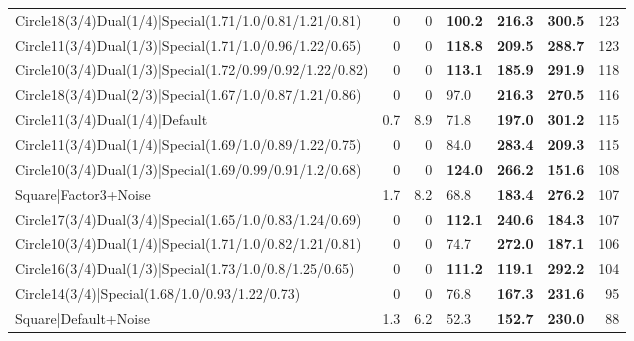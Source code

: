 \begin{tabular}{lrrlllr}
 Circle18(3/4)Dual(1/4)|Special(1.71/1.0/0.81/1.21/0.81)      &          0   &            0   & \textbf{100.2} & \textbf{216.3} & \textbf{300.5} &          123 \\
 Circle11(3/4)Dual(1/3)|Special(1.71/1.0/0.96/1.22/0.65)      &          0   &            0   & \textbf{118.8} & \textbf{209.5} & \textbf{288.7} &          123 \\
 Circle10(3/4)Dual(1/3)|Special(1.72/0.99/0.92/1.22/0.82)     &          0   &            0   & \textbf{113.1} & \textbf{185.9} & \textbf{291.9} &          118 \\
 Circle18(3/4)Dual(2/3)|Special(1.67/1.0/0.87/1.21/0.86)      &          0   &            0   & 97.0           & \textbf{216.3} & \textbf{270.5} &          116 \\
 Circle11(3/4)Dual(1/4)|Default                               &          0.7 &            8.9 & 71.8           & \textbf{197.0} & \textbf{301.2} &          115 \\
 Circle11(3/4)Dual(1/4)|Special(1.69/1.0/0.89/1.22/0.75)      &          0   &            0   & 84.0           & \textbf{283.4} & \textbf{209.3} &          115 \\
 Circle10(3/4)Dual(1/3)|Special(1.69/0.99/0.91/1.2/0.68)      &          0   &            0   & \textbf{124.0} & \textbf{266.2} & \textbf{151.6} &          108 \\
 Square|Factor3+Noise                                         &          1.7 &            8.2 & 68.8           & \textbf{183.4} & \textbf{276.2} &          107 \\
 Circle17(3/4)Dual(3/4)|Special(1.65/1.0/0.83/1.24/0.69)      &          0   &            0   & \textbf{112.1} & \textbf{240.6} & \textbf{184.3} &          107 \\
 Circle10(3/4)Dual(1/4)|Special(1.71/1.0/0.82/1.21/0.81)      &          0   &            0   & 74.7           & \textbf{272.0} & \textbf{187.1} &          106 \\
 Circle16(3/4)Dual(1/3)|Special(1.73/1.0/0.8/1.25/0.65)       &          0   &            0   & \textbf{111.2} & \textbf{119.1} & \textbf{292.2} &          104 \\
 Circle14(3/4)|Special(1.68/1.0/0.93/1.22/0.73)               &          0   &            0   & 76.8           & \textbf{167.3} & \textbf{231.6} &           95 \\
 Square|Default+Noise                                         &          1.3 &            6.2 & 52.3           & \textbf{152.7} & \textbf{230.0} &           88 \\

\end{tabular}
